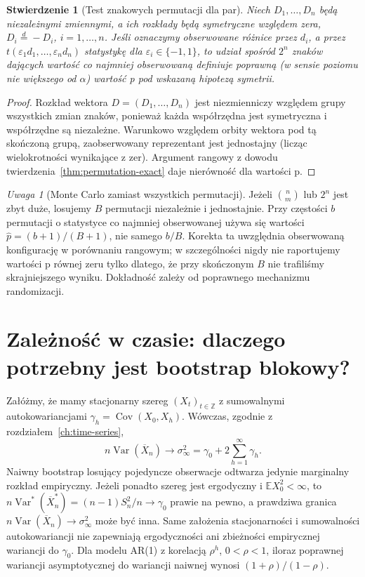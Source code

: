 \documentclass[11pt,a4paper,oneside]{report}
\numberwithin{equation}{chapter}
\theoremstyle{plain}
\newtheorem{stwierdzenie}[twierdzenie]{Stwierdzenie}
\theoremstyle{definition}
\theoremstyle{remark}
\newtheorem{uwaga}{Uwaga}[chapter]
\newcommand{\E}{\mathbb E}
\newcommand{\Var}{\operatorname{Var}}
\newcommand{\Cov}{\operatorname{Cov}}
\begin{document}
\begin{stwierdzenie}[Test znakowych permutacji dla par]
\label{prop:signflip}
Niech $D_1,\ldots,D_n$ będą niezależnymi zmiennymi,
a ich rozkłady będą symetryczne względem zera,
$D_i\overset d=-D_i$, $i=1,\ldots,n$.
Jeśli oznaczymy obserwowane różnice przez $d_i$,
a przez $t(\varepsilon_1d_1,\ldots,\varepsilon_nd_n)$
statystykę dla $\varepsilon_i\in\{-1,1\}$,
to udział spośród $2^n$ znaków dających wartość
co najmniej obserwowaną definiuje poprawną
(w sensie poziomu nie większego od $\alpha$)
wartość p pod wskazaną hipotezą symetrii.
\end{stwierdzenie}
\begin{proof}
Rozkład wektora $D=(D_1,\ldots,D_n)$ jest niezmienniczy
względem grupy wszystkich zmian znaków, ponieważ
każda współrzędna jest symetryczna i współrzędne są niezależne.
Warunkowo względem orbity wektora pod tą skończoną grupą,
zaobserwowany reprezentant jest jednostajny (licząc
wielokrotności wynikające z zer). Argument rangowy
z dowodu twierdzenia~\ref{thm:permutation-exact}
daje nierówność dla wartości p.
\end{proof}

\begin{uwaga}[Monte Carlo zamiast wszystkich permutacji]
Jeżeli $\binom nm$ lub $2^n$ jest zbyt duże,
losujemy $B$ permutacji niezależnie i jednostajnie.
Przy częstości $b$ permutacji o statystyce co najmniej
obserwowanej używa się wartości
$\widehat p=(b+1)/(B+1)$, nie samego $b/B$.
Korekta ta uwzględnia obserwowaną konfigurację
w porównaniu rangowym; w szczególności nigdy nie
raportujemy wartości p równej zeru tylko dlatego,
że przy skończonym $B$ nie trafiliśmy skrajniejszego wyniku.
Dokładność zależy od poprawnego mechanizmu randomizacji.
\end{uwaga}

\section{Zależność w czasie: dlaczego potrzebny jest bootstrap blokowy?}
\label{sec:block-bootstrap}
Załóżmy, że mamy stacjonarny szereg $(X_t)_{t\in\mathbb Z}$
z sumowalnymi autokowariancjami $\gamma_h=\Cov(X_0,X_h)$.
Wówczas, zgodnie z rozdziałem~\ref{ch:time-series},
\[
 n\Var(\overline X_n)\longrightarrow
 \sigma_\infty^2=\gamma_0+2\sum_{h=1}^\infty\gamma_h.
\]
Naiwny bootstrap losujący pojedyncze obserwacje odtwarza
jedynie marginalny rozkład empiryczny. Jeżeli ponadto
szereg jest ergodyczny i $\E X_0^2<\infty$, to
$n\Var^*(\overline X_n^*)=(n-1)S_n^2/n\to\gamma_0$
prawie na pewno, a prawdziwa granica
$n\Var(\overline X_n)\to\sigma_\infty^2$
może być inna. Same założenia stacjonarności i sumowalności
autokowariancji nie zapewniają ergodyczności ani
zbieżności empirycznej wariancji do $\gamma_0$.
Dla modelu AR(1) z korelacją $\rho^h$, $0<\rho<1$,
iloraz poprawnej wariancji asymptotycznej do wariancji
naiwnej wynosi $(1+\rho)/(1-\rho)$.
\end{document}
